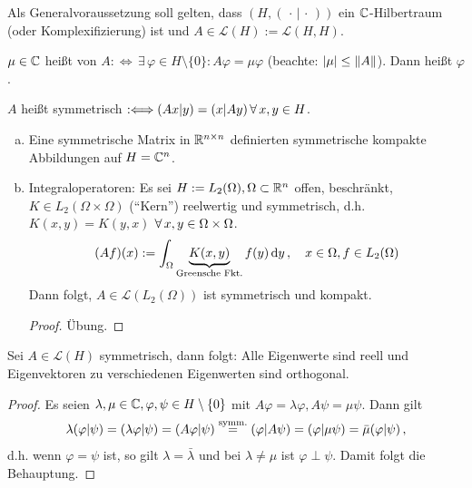 Als Generalvoraussetzung soll gelten, dass $(H,(\, \cdot\, \vert \, \cdot \, ))$ ein $\mathbb{C}$-Hilbertraum (oder Komplexifizierung) ist und $A \in \mathcal L(H):=\mathcal L(H,H)$.

\begin{defi}
$\mu \in \mathbb{C}$ heißt  von $A : \Longleftrightarrow \, \exists \, \varphi \in H \setminus \{0\} : A \varphi = \mu \varphi$ (beachte: $\lvert \mu\rvert \leq \lVert A\rVert$). Dann heißt $\varphi$ .

$A$ heißt symmetrisch $: \Longleftrightarrow (Ax | y ) = (x| Ay) \, \forall \, x,y \in H$.
\end{defi}

\begin{bsp}\label{bsp:7.31}
\begin{enumerate}[(a)]
\item Eine symmetrische Matrix in $\mathbb{R}^{n\times n}$ definierten symmetrische kompakte Abbildungen auf $H = \mathbb{C}^n$.
\item Integraloperatoren: Es sei $H:= L_2(\Omega), \Omega \subset \mathbb{R}^n$ offen, beschränkt, $K \in L_2(\Omega \times \Omega)$ ("`Kern"') reelwertig und symmetrisch, d.h. $K(x,y) = K(y,x)$ $ \forall \, x,y \in \Omega \times \Omega$.
\[
	(Af)(x) := \int_{\Omega} \underbrace{K(x,y)}_{\scriptsize\text{Greensche Fkt.}} f(y) \,\mathrm{d} y \, , \quad x \in \Omega, f \in L_2(\Omega)
\]
Dann folgt, $A \in \mathcal L(L_2(\Omega))$ ist symmetrisch und kompakt.
\begin{proof}
Übung.
\end{proof}
\end{enumerate}
\end{bsp}

\begin{satz}\label{satz:7.32}
Sei $A \in \mathcal L(H)$ symmetrisch, dann folgt: Alle Eigenwerte sind reell und Eigenvektoren zu verschiedenen Eigenwerten sind orthogonal.
\end{satz}

\begin{proof}
Es seien $\lambda, \mu \in \mathbb{C}, \varphi, \psi \in H\setminus\{0\}$ mit $A\varphi = \lambda \varphi, A\psi = \mu \psi$. Dann gilt
\begin{align*}
\lambda (\varphi\vert\psi) = (\lambda \varphi \vert \psi) = (A \varphi \vert \psi) \stackrel{\scriptsize\text{symm.}}=(\varphi\vert A\psi)=(\varphi\vert\mu\psi) = \bar\mu(\varphi\vert\psi) \, ,
\end{align*}
d.h. wenn $\varphi = \psi$ ist, so gilt $\lambda = \bar\lambda$ und bei $\lambda \neq \mu$ ist $\varphi \perp \psi$. Damit folgt die Behauptung.
\end{proof}

